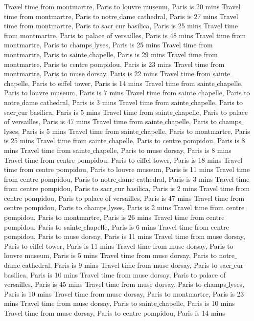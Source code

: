 \documentclass[doubleblind]{ecai}
\begin{document}
{Travel time from montmartre, Paris to louvre museum, Paris is 20 mins
Travel time from montmartre, Paris to notre$\_$dame cathedral, Paris is 27 mins
Travel time from montmartre, Paris to sacr$\_$cur basilica, Paris is 25 mins
Travel time from montmartre, Paris to palace of versailles, Paris is 48 mins
Travel time from montmartre, Paris to champs$\_$lyses, Paris is 25 mins
Travel time from montmartre, Paris to sainte$\_$chapelle, Paris is 29 mins
Travel time from montmartre, Paris to centre pompidou, Paris is 23 mins
Travel time from montmartre, Paris to muse dorsay, Paris is 22 mins
Travel time from sainte$\_$chapelle, Paris to eiffel tower, Paris is 14 mins
Travel time from sainte$\_$chapelle, Paris to louvre museum, Paris is 7 mins
Travel time from sainte$\_$chapelle, Paris to notre$\_$dame cathedral, Paris is 3 mins
Travel time from sainte$\_$chapelle, Paris to sacr$\_$cur basilica, Paris is 5 mins
Travel time from sainte$\_$chapelle, Paris to palace of versailles, Paris is 47 mins
Travel time from sainte$\_$chapelle, Paris to champs$\_$lyses, Paris is 5 mins
Travel time from sainte$\_$chapelle, Paris to montmartre, Paris is 25 mins
Travel time from sainte$\_$chapelle, Paris to centre pompidou, Paris is 8 mins
Travel time from sainte$\_$chapelle, Paris to muse dorsay, Paris is 8 mins
Travel time from centre pompidou, Paris to eiffel tower, Paris is 18 mins
Travel time from centre pompidou, Paris to louvre museum, Paris is 11 mins
Travel time from centre pompidou, Paris to notre$\_$dame cathedral, Paris is 3 mins
Travel time from centre pompidou, Paris to sacr$\_$cur basilica, Paris is 2 mins
Travel time from centre pompidou, Paris to palace of versailles, Paris is 47 mins
Travel time from centre pompidou, Paris to champs$\_$lyses, Paris is 2 mins
Travel time from centre pompidou, Paris to montmartre, Paris is 26 mins
Travel time from centre pompidou, Paris to sainte$\_$chapelle, Paris is 6 mins
Travel time from centre pompidou, Paris to muse dorsay, Paris is 11 mins
Travel time from muse dorsay, Paris to eiffel tower, Paris is 11 mins
Travel time from muse dorsay, Paris to louvre museum, Paris is 5 mins
Travel time from muse dorsay, Paris to notre$\_$dame cathedral, Paris is 9 mins
Travel time from muse dorsay, Paris to sacr$\_$cur basilica, Paris is 10 mins
Travel time from muse dorsay, Paris to palace of versailles, Paris is 45 mins
Travel time from muse dorsay, Paris to champs$\_$lyses, Paris is 10 mins
Travel time from muse dorsay, Paris to montmartre, Paris is 23 mins
Travel time from muse dorsay, Paris to sainte$\_$chapelle, Paris is 10 mins
Travel time from muse dorsay, Paris to centre pompidou, Paris is 14 mins
}

\end{document}
